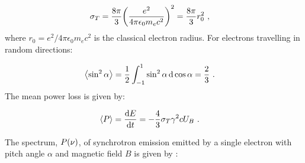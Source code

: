 \begin{equation}
    \begin{aligned}
    \sigma_T&=\frac{8\pi}{3}\qty(\frac{e^2}{4\pi\epsilon_0m_ec^2})^2=\frac{8\pi}{3}r_0^2\text{ ,}
    \end{aligned}
\end{equation}
\noindent where $r_0={e^2}/{4\pi\epsilon_0m_ec^2}$ is the classical electron radius. For electrons travelling in random directions:

\begin{equation}
    \begin{aligned}
        \left\langle \sin^2\alpha \right\rangle&=\frac{1}{2} \int_{-1}^1\sin^2\alpha\dd{\cos\alpha}=\frac{2}{3}\text{ .}
    \end{aligned}
\end{equation}
\noindent The mean power loss is given by:

\begin{equation}
    \begin{aligned}
    \left\langle P\right\rangle&=\dv{E}{t}=-\frac{4}{3}\sigma_T\gamma^2 c U_B\text{ .}
    \end{aligned} \label{eq:01_leptonic_sync_energy_loss}
\end{equation}

The spectrum, $P\qty(\nu)$, of synchrotron emission emitted by a single electron with pitch angle $\alpha$ and magnetic field $B$ is given by \citep{2007A&A...474..689M}:


